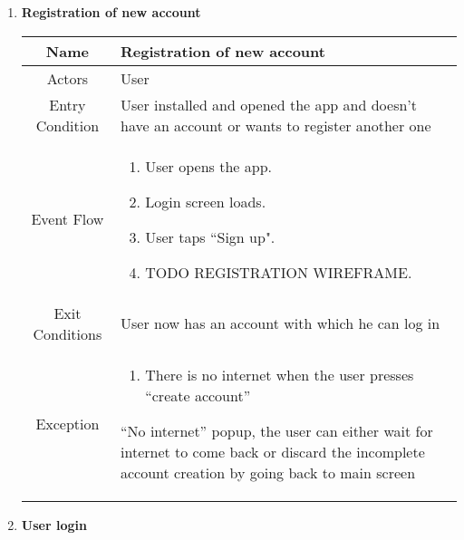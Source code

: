 \begin{enumerate}
	
\item \textbf{Registration of new account}

\begin{table}[H]
{
\begin{tabular}{|c|p{14cm}|}
	\hline
	Name & Registration of new account\\
	\hline
	Actors & User\\
	\hline
	Entry Condition & User installed and opened the app and doesn’t have an account or wants to register another one\\
	\hline
	Event Flow & \begin{enumerate}
		\item User opens the app.
		\item Login screen loads.
		\item User taps “Sign up".
		\item TODO REGISTRATION WIREFRAME.
		\end{enumerate}\\
	\hline
	Exit Conditions & User now has an account with which he can log in\\
	\hline
	Exception & \begin{enumerate}
		\item There is no internet when the user presses “create account”
	\end{enumerate}
	
	“No internet” popup, the user can either wait for internet to come back or discard the incomplete account creation by going back to main screen\\
	\hline
\end{tabular}
}
\end{table}
\item \textbf{User login}
	

\end{enumerate}
